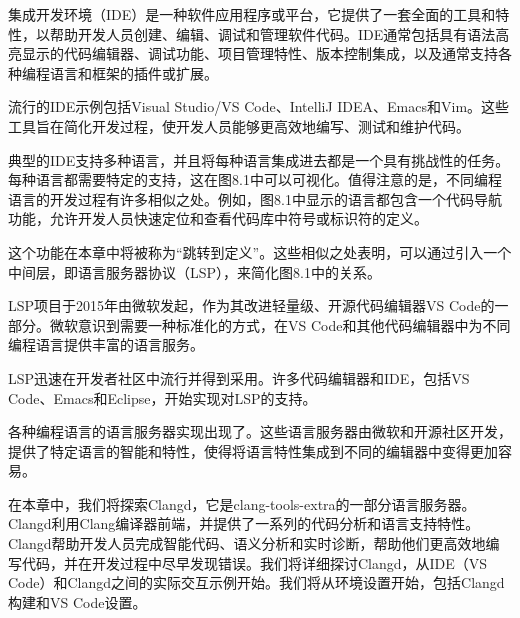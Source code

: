 集成开发环境（IDE）是一种软件应用程序或平台，它提供了一套全面的工具和特性，以帮助开发人员创建、编辑、调试和管理软件代码。IDE通常包括具有语法高亮显示的代码编辑器、调试功能、项目管理特性、版本控制集成，以及通常支持各种编程语言和框架的插件或扩展。

流行的IDE示例包括Visual Studio/VS Code、IntelliJ IDEA、Emacs和Vim。这些工具旨在简化开发过程，使开发人员能够更高效地编写、测试和维护代码。

典型的IDE支持多种语言，并且将每种语言集成进去都是一个具有挑战性的任务。每种语言都需要特定的支持，这在图8.1中可以可视化。值得注意的是，不同编程语言的开发过程有许多相似之处。例如，图8.1中显示的语言都包含一个代码导航功能，允许开发人员快速定位和查看代码库中符号或标识符的定义。


这个功能在本章中将被称为“跳转到定义”。这些相似之处表明，可以通过引入一个中间层，即语言服务器协议（LSP），来简化图8.1中的关系。


LSP项目于2015年由微软发起，作为其改进轻量级、开源代码编辑器VS Code的一部分。微软意识到需要一种标准化的方式，在VS Code和其他代码编辑器中为不同编程语言提供丰富的语言服务。

LSP迅速在开发者社区中流行并得到采用。许多代码编辑器和IDE，包括VS Code、Emacs和Eclipse，开始实现对LSP的支持。

各种编程语言的语言服务器实现出现了。这些语言服务器由微软和开源社区开发，提供了特定语言的智能和特性，使得将语言特性集成到不同的编辑器中变得更加容易。

在本章中，我们将探索Clangd，它是clang-tools-extra的一部分语言服务器。Clangd利用Clang编译器前端，并提供了一系列的代码分析和语言支持特性。Clangd帮助开发人员完成智能代码、语义分析和实时诊断，帮助他们更高效地编写代码，并在开发过程中尽早发现错误。我们将详细探讨Clangd，从IDE（VS Code）和Clangd之间的实际交互示例开始。我们将从环境设置开始，包括Clangd构建和VS Code设置。
































